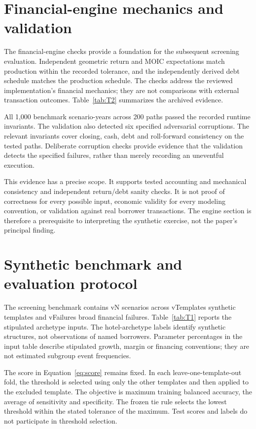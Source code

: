 \documentclass[11pt,a4paper]{article}
\newcommand{\exhibit}[1]{}
\newcommand{\val}[1]{\csname v#1\endcsname}
\begin{document}
\exhibit{T1}

\section{Financial-engine mechanics and validation}
The financial-engine checks provide a foundation for the subsequent screening evaluation. Independent geometric return and MOIC expectations match production within the recorded tolerance, and the independently derived debt schedule matches the production schedule. The checks address the reviewed implementation's financial mechanics; they are not comparisons with external transaction outcomes. Table~\ref{tab:T2} summarizes the archived evidence.

All 1,000 benchmark scenario-years across 200 paths passed the recorded runtime invariants. The validation also detected six specified adversarial corruptions. The relevant invariants cover closing, cash, debt and roll-forward consistency on the tested paths. Deliberate corruption checks provide evidence that the validation detects the specified failures, rather than merely recording an uneventful execution.

This evidence has a precise scope. It supports tested accounting and mechanical consistency and independent return/debt sanity checks. It is not proof of correctness for every possible input, economic validity for every modeling convention, or validation against real borrower transactions. The engine section is therefore a prerequisite to interpreting the synthetic exercise, not the paper's principal finding.
\exhibit{T2}

\section{Synthetic benchmark and evaluation protocol}
The screening benchmark contains \val{N} scenarios across \val{Templates} synthetic templates and \val{Failures} broad financial failures. Table~\ref{tab:T1} reports the stipulated archetype inputs. The hotel-archetype labels identify synthetic structures, not observations of named borrowers. Parameter percentages in the input table describe stipulated growth, margin or financing conventions; they are not estimated subgroup event frequencies.

The score in Equation~\ref{eq:score} remains fixed. In each leave-one-template-out fold, the threshold is selected using only the other templates and then applied to the excluded template. The objective is maximum training balanced accuracy, the average of sensitivity and specificity. The frozen tie rule selects the lowest threshold within the stated tolerance of the maximum. Test scores and labels do not participate in threshold selection.
\end{document}
